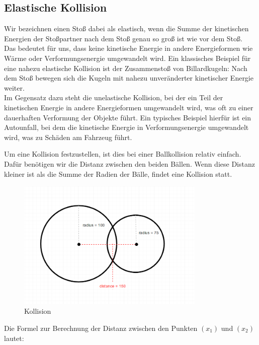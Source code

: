 \documentclass[12pt,a4paper]{article}
\begin{document}
	\subsection{Elastische Kollision}	
	Wir bezeichnen einen Stoß dabei als elastisch, wenn die Summe der kinetischen Energien der Stoßpartner nach dem Stoß genau so groß ist wie vor dem Stoß. \cite{leifiphysik1}~ \\
	Das bedeutet für uns, dass keine kinetische Energie in andere Energieformen wie Wärme oder Verformungsenergie umgewandelt wird. Ein klassisches Beispiel für eine nahezu elastische Kollision ist der Zusammenstoß von Billardkugeln: Nach dem Stoß bewegen sich die Kugeln mit nahezu unveränderter kinetischer Energie weiter.\\ Im Gegensatz dazu steht die unelastische Kollision, bei der ein Teil der kinetischen Energie in andere Energieformen umgewandelt wird, was oft zu einer dauerhaften Verformung der Objekte führt. Ein typisches Beispiel hierfür ist ein Autounfall, bei dem die kinetische Energie in Verformungsenergie umgewandelt wird, was zu Schäden am Fahrzeug führt.
	
	\vspace{0.5cm}
	
Um eine Kollision festzustellen, ist dies bei einer Ballkollision relativ einfach. Dafür benötigen wir die Distanz zwischen den beiden Bällen. Wenn diese Distanz kleiner ist als die Summe der Radien der Bälle, findet eine Kollision statt.

\begin{figure}[H]
	\centering 
	\includegraphics[width=0.8\textwidth]{../data/collision-detection-6.png}  
	\caption{Kollision  \cite{happycoding}} 
	\label{Bild: Kollision}  
\end{figure}


Die Formel zur Berechnung der Distanz zwischen den Punkten \( (x_1) \) und \( (x_2) \) lautet:
\end{document}
